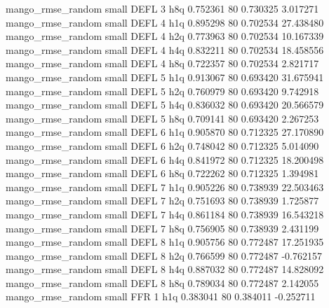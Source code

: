mango_rmse_random      small     DEFL                 3                  h8q 0.752361 80       0.730325           3.017271
mango_rmse_random      small     DEFL                 4                  h1q 0.895298 80       0.702534          27.438480
mango_rmse_random      small     DEFL                 4                  h2q 0.773963 80       0.702534          10.167339
mango_rmse_random      small     DEFL                 4                  h4q 0.832211 80       0.702534          18.458556
mango_rmse_random      small     DEFL                 4                  h8q 0.722357 80       0.702534           2.821717
mango_rmse_random      small     DEFL                 5                  h1q 0.913067 80       0.693420          31.675941
mango_rmse_random      small     DEFL                 5                  h2q 0.760979 80       0.693420           9.742918
mango_rmse_random      small     DEFL                 5                  h4q 0.836032 80       0.693420          20.566579
mango_rmse_random      small     DEFL                 5                  h8q 0.709141 80       0.693420           2.267253
mango_rmse_random      small     DEFL                 6                  h1q 0.905870 80       0.712325          27.170890
mango_rmse_random      small     DEFL                 6                  h2q 0.748042 80       0.712325           5.014090
mango_rmse_random      small     DEFL                 6                  h4q 0.841972 80       0.712325          18.200498
mango_rmse_random      small     DEFL                 6                  h8q 0.722262 80       0.712325           1.394981
mango_rmse_random      small     DEFL                 7                  h1q 0.905226 80       0.738939          22.503463
mango_rmse_random      small     DEFL                 7                  h2q 0.751693 80       0.738939           1.725877
mango_rmse_random      small     DEFL                 7                  h4q 0.861184 80       0.738939          16.543218
mango_rmse_random      small     DEFL                 7                  h8q 0.756905 80       0.738939           2.431199
mango_rmse_random      small     DEFL                 8                  h1q 0.905756 80       0.772487          17.251935
mango_rmse_random      small     DEFL                 8                  h2q 0.766599 80       0.772487          -0.762157
mango_rmse_random      small     DEFL                 8                  h4q 0.887032 80       0.772487          14.828092
mango_rmse_random      small     DEFL                 8                  h8q 0.789034 80       0.772487           2.142055
mango_rmse_random      small      FFR                 1                  h1q 0.383041 80       0.384011          -0.252711

